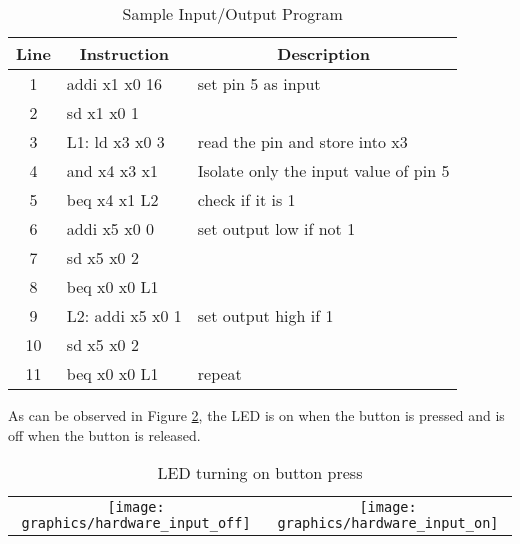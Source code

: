 \begin{table}[!h]
    \centering
    \caption{Sample Input/Output Program}
    \label{program:sample_io}
    \begin{tabular}{|c|l|l|}
        \hline
        \textbf{Line} & \multicolumn{1}{c|}{\textbf{Instruction}} & \multicolumn{1}{c|}{\textbf{Description}} \\ \hline
        1             & addi x1 x0 16                             & set pin 5 as input                        \\ \hline
        2             & sd x1 x0 1                                &                                           \\ \hline
        3             & L1: ld x3 x0 3                            & read the pin and store into x3            \\ \hline
        4             & and x4 x3 x1                              & Isolate only the input value of pin 5     \\ \hline
        5             & beq x4 x1 L2                              & check if it is 1                          \\ \hline
        6             & addi x5 x0 0                              & set output low if not 1                   \\ \hline
        7             & sd x5 x0 2                                &                                           \\ \hline
        8             & beq x0 x0 L1                              &                                           \\ \hline
        9             & L2: addi x5 x0 1                          & set output high if 1                      \\ \hline
        10            & sd x5 x0 2                                &                                           \\ \hline
        11            & beq x0 x0 L1                              & repeat                                    \\ \hline
    \end{tabular}
\end{table}

As can be observed in Figure \ref{graphic:input_on_off}, the LED is on when the button is pressed and is off when the button is released.\
\begin{table}
    \centering
    \begin{tabular}{cc}
        \texttt{[image: graphics/hardware\_input\_off]} & \texttt{[image: graphics/hardware\_input\_on]}
    \end{tabular}
    \caption{LED turning on button press}
    \label{graphic:input_on_off}
\end{table}

